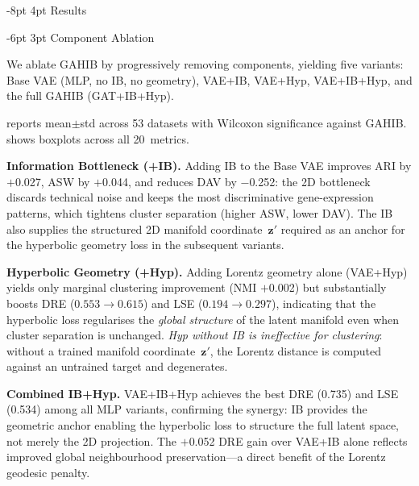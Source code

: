 \documentclass[preprint,12pt]{elsarticle}
\makeatletter
\renewcommand\section{\@startsection{section}{1}{\z@}%
  {-8pt \@plus -2pt \@minus -2pt}%
  {4pt \@plus 1pt \@minus 1pt}%
  {\normalfont\Large\bfseries}}
\renewcommand\subsection{\@startsection{subsection}{2}{\z@}%
  {-6pt \@plus -2pt \@minus -2pt}%
  {3pt \@plus 1pt \@minus 1pt}%
  {\normalfont\large\bfseries}}
\newcommand{\bz}{\mathbf{z}}
\makeatother
\begin{document}
\section{Results}\label{sec:results}

\subsection{Component Ablation}\label{sec:ablation}

We ablate GAHIB by progressively removing components, yielding five
variants: Base VAE (MLP, no IB, no geometry), VAE+IB, VAE+Hyp,
VAE+IB+Hyp, and the full GAHIB (GAT+IB+Hyp).

 reports mean$\pm$std across 53 datasets with Wilcoxon
significance against GAHIB.
 shows boxplots across all 20~metrics.

\textbf{Information Bottleneck (+IB).}
Adding IB to the Base VAE improves ARI by $+$0.027, ASW by $+$0.044, and
reduces DAV by $-$0.252: the 2D bottleneck discards technical noise and
keeps the most discriminative gene-expression patterns, which tightens
cluster separation (higher ASW, lower DAV). The IB also supplies the
structured 2D manifold coordinate~$\bz'$ required as an anchor for the
hyperbolic geometry loss in the subsequent variants.

\textbf{Hyperbolic Geometry (+Hyp).}
Adding Lorentz geometry alone (VAE+Hyp) yields only marginal clustering
improvement (NMI $+$0.002) but substantially boosts DRE
($0.553 \to 0.615$) and LSE ($0.194 \to 0.297$), indicating that the
hyperbolic loss regularises the \emph{global structure} of the latent
manifold even when cluster separation is unchanged.
\emph{Hyp without IB is ineffective for clustering}: without a
trained manifold coordinate~$\bz'$, the Lorentz distance is computed
against an untrained target and degenerates.

\textbf{Combined IB+Hyp.}
VAE+IB+Hyp achieves the best DRE (0.735) and LSE (0.534) among all MLP
variants, confirming the synergy: IB provides the geometric anchor
enabling the hyperbolic loss to structure the full latent space, not
merely the 2D projection.
The $+$0.052 DRE gain over VAE+IB alone reflects improved global
neighbourhood preservation---a direct benefit of the Lorentz geodesic
penalty.
\end{document}
